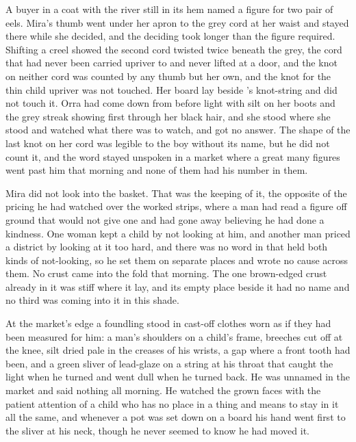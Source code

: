 A buyer in a coat with the river still in its hem named a figure for two pair of eels. Mira's thumb went under her apron to the grey cord at her waist and stayed there while she decided, and the deciding took longer than the figure required. Shifting a creel showed the second cord twisted twice beneath the grey, the cord that had never been carried upriver to  and never lifted at a door, and the knot on neither cord was counted by any thumb but her own, and the knot for the thin child upriver was not touched. Her board lay beside 's knot-string and did not touch it. Orra had come down from  before light with silt on her boots and the grey streak showing first through her black hair, and she stood where she stood and watched what there was to watch, and got no answer. The shape of the last knot on her cord was legible to the boy without its name, but he did not count it, and the word stayed unspoken in a market where a great many figures went past him that morning and none of them had his number in them.

Mira did not look into the basket. That was the keeping of it, the opposite of the pricing he had watched over the worked strips, where a man had read a figure off ground that would not give one and had gone away believing he had done a kindness. One woman kept a child by not looking at him, and another man priced a district by looking at it too hard, and there was no word in  that held both kinds of not-looking, so he set them on separate places and wrote no cause across them. No crust came into the fold that morning. The one brown-edged crust already in it was stiff where it lay, and its empty place beside it had no name and no third was coming into it in this shade.

\scenebreak

At the market's edge a foundling stood in cast-off clothes worn as if they had been measured for him: a man's shoulders on a child's frame, breeches cut off at the knee, silt dried pale in the creases of his wrists, a gap where a front tooth had been, and a green sliver of lead-glaze on a string at his throat that caught the light when he turned and went dull when he turned back. He was unnamed in the market and said nothing all morning. He watched the grown faces with the patient attention of a child who has no place in a thing and means to stay in it all the same, and whenever a pot was set down on a board his hand went first to the sliver at his neck, though he never seemed to know he had moved it.

